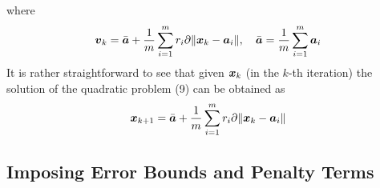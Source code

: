 where
\begin{equation} %
\begin{aligned}
\Bv_k  = \bar{\Ba} + \frac{1}{m} \sum^m_{i=1} r_i \partial \|\Bx_k - \Ba_i\| , \quad \bar{\Ba} = \frac{1}{m}  \sum^m_{i = 1} \Ba_i 
\end{aligned}
\end{equation}
It is rather straightforward to see that given $\mbox{\boldmath$x$}_k$ (in the $k$-th iteration) the solution of the quadratic problem (9) can be obtained as
\begin{equation} %
\Bx_{k+1} = \bar{\Ba} + \frac{1}{m} \sum^m_{i=1} r_i \partial \|\Bx_k - \Ba_i\|
\end{equation}
%
%
%	
\subsection{Imposing Error Bounds and Penalty Terms }

